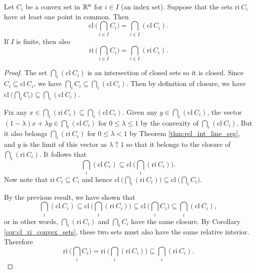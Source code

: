 \documentclass[11pt,a4paper]{article}
\begin{document}
\begin{theorem}\label{thm:intersection_of_ri_cl}
    Let $C_i$ be a convex set in $\mathbb{R}^n$ for $i\in I$ (an index set). Suppose that the sets $\mathrm{ri}\ C_i$ have at least one point in common. Then 
    \begin{equation*}
        \mathrm{cl}\ \bigg(\bigcap_{i\in I} C_i\bigg) = \bigcap_{i\in I} (\mathrm{cl}\ C_i).
    \end{equation*}
    If $I$ is finite, then also 
    \begin{equation*}
        \mathrm{ri}\ \bigg(\bigcap_{i\in I} C_i\bigg) = \bigcap_{i\in I} (\mathrm{ri}\ C_i).
    \end{equation*}
\end{theorem}

\begin{proof}
    \forward The set $\bigcap_{i} (\mathrm{cl}\ C_i)$ is an intersection of closed sets so it is closed. Since $C_i\subseteq \mathrm{cl}\ C_i$, we have $\bigcap_{i} C_i \subseteq \bigcap_{i} (\mathrm{cl}\ C_i)$. Then by definition of closure, we have $\mathrm{cl}\ \Big(\bigcap_{i} C_i\Big) \subseteq \bigcap_{i} (\mathrm{cl}\ C_i)$.

    \noindent \converse Fix any $x\in \bigcap_{i} (\mathrm{ri}\ C_i) \subseteq \bigcap_{i} (\mathrm{cl}\ C_i)$. Given any $y\in \bigcap_{i} (\mathrm{cl}\ C_i)$, the vector $(1-\lambda)x+\lambda y\in \bigcap_{i} (\mathrm{cl}\ C_i)$ for $0\le\lambda\le 1$ by the convexity of $\bigcap_{i} (\mathrm{cl}\ C_i)$. But it also belongs $\bigcap_i (\mathrm{ri}\ C_i)$ for $0\le \lambda<1$ by Theorem \ref{thm:rel_int_line_seg}, and $y$ is the limit of this vector as $\lambda\uparrow 1$ so that it belongs to the closure of $\bigcap_i (\mathrm{ri}\ C_i)$. It follows that 
    \begin{equation*}
        \bigcap_{i} (\mathrm{cl}\ C_i)\subseteq \mathrm{cl}\ \Big(\bigcap_{i} (\mathrm{ri}\ C_i)\Big).
    \end{equation*}
    Now note that $\mathrm{ri}\ C_i\subseteq C_i$ and hence $\mathrm{cl}\ \Big(\bigcap_{i} (\mathrm{ri}\ C_i)\Big) \subseteq \mathrm{cl}\ \Big(\bigcap_{i} C_i\Big)$. 

    \noindent \forward By the previous result, we have shown that 
    \begin{equation*}
        \bigcap_{i} (\mathrm{cl}\ C_i)\subseteq \mathrm{cl}\ \Big(\bigcap_{i} (\mathrm{ri}\ C_i)\Big) \subseteq \mathrm{cl}\ \Big(\bigcap_{i} C_i\Big) \subseteq \bigcap_{i} (\mathrm{cl}\ C_i),
    \end{equation*}
    or in other words, $\bigcap_i (\mathrm{ri}\ C_i)$ and $\bigcap_i C_i$ have the same closure. By Corollary \ref{cor:cl_ri_convex_sets}, these two sets must also have the same relative interior. Therefore
    \begin{equation*}
        \mathrm{ri}\ \Big(\bigcap_{i} C_i\Big) = \mathrm{ri}\ \Big(\bigcap_i (\mathrm{ri}\ C_i)\Big) \subseteq \bigcap_{i} (\mathrm{ri}\ C_i).
    \end{equation*}


\end{proof}
\end{document}
